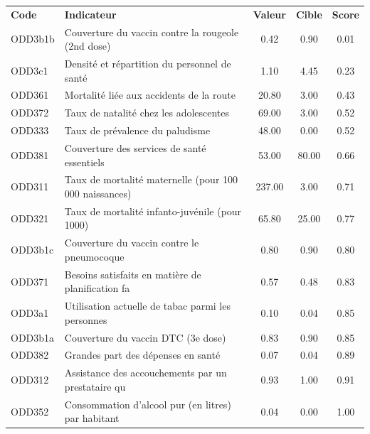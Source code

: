 \begin{table}[H]
	\centering
	\begin{tabularx}{\textwidth}{l l c c c}
		\rowcolor[HTML]{003D82}
		\color{white}\textbf{Code} & \color{white}\textbf{Indicateur} & \color{white}\textbf{Valeur} & \color{white}\textbf{Cible} & \color{white}\textbf{Score} \\
		\rowcolor[HTML]{F5F8FC}
		ODD3b1b & Couverture du vaccin contre la rougeole (2nd dose) & 0.42 & 0.90 & 0.01 \\
		\rowcolor[HTML]{E8F0FF}
		ODD3c1 & Densité et répartition du personnel de santé & 1.10 & 4.45 & 0.23 \\
		\rowcolor[HTML]{F5F8FC}
		ODD361 & Mortalité liée aux accidents de la route & 20.80 & 3.00 & 0.43 \\
		\rowcolor[HTML]{E8F0FF}
		ODD372 & Taux de natalité chez les adolescentes & 69.00 & 3.00 & 0.52 \\
		\rowcolor[HTML]{F5F8FC}
		ODD333 & Taux de prévalence du paludisme & 48.00 & 0.00 & 0.52 \\
		\rowcolor[HTML]{E8F0FF}
		ODD381 & Couverture des services de santé essentiels & 53.00 & 80.00 & 0.66 \\
		\rowcolor[HTML]{F5F8FC}
		ODD311 & Taux de mortalité maternelle (pour 100 000 naissances) & 237.00 & 3.00 & 0.71 \\
		\rowcolor[HTML]{E8F0FF}
		ODD321 & Taux de mortalité  infanto-juvénile  (pour 1000) & 65.80 & 25.00 & 0.77 \\
		\rowcolor[HTML]{F5F8FC}
		ODD3b1c & Couverture du vaccin contre le pneumocoque & 0.80 & 0.90 & 0.80 \\
		\rowcolor[HTML]{E8F0FF}
		ODD371 & Besoins satisfaits en matière de planification fa & 0.57 & 0.48 & 0.83 \\
		\rowcolor[HTML]{F5F8FC}
		ODD3a1 & Utilisation actuelle de tabac parmi les personnes & 0.10 & 0.04 & 0.85 \\
		\rowcolor[HTML]{E8F0FF}
		ODD3b1a & Couverture du vaccin DTC (3e dose) & 0.83 & 0.90 & 0.85 \\
		\rowcolor[HTML]{F5F8FC}
		ODD382 & Grandes part des dépenses en santé & 0.07 & 0.04 & 0.89 \\
		\rowcolor[HTML]{E8F0FF}
		ODD312 & Assistance des accouchements par un prestataire qu & 0.93 & 1.00 & 0.91 \\
		\rowcolor[HTML]{F5F8FC}
		ODD352 & Consommation d'alcool pur (en litres) par habitant & 0.04 & 0.00 & 1.00 \\
	\end{tabularx}
\end{table}

